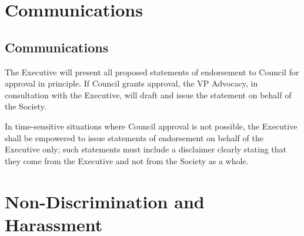\section{Communications}
\subsection{Communications}
\begin{longenum}[ label*=\thesection.\arabic*., align=left]
	\item The Executive will present all proposed statements of endorsement to Council for approval in principle. If Council grants approval, the VP Advocacy, in consultation with the Executive, will draft and issue the statement on behalf of the Society. 
    \item In time-sensitive situations where Council approval is not possible, the Executive shall be empowered to issue statements of endorsement on behalf of the Executive only; such statements must include a disclaimer clearly stating that they come from the Executive and not from the Society as a whole. 
\end{longenum}
\newpage

\section{Non-Discrimination and Harassment}



